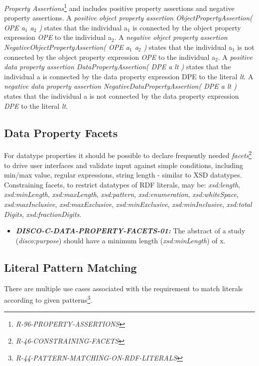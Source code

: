 \documentclass{llncs}
\begin{document}
\emph{{Property Assertions}}\footnote{\emph{R-96-PROPERTY-ASSERTIONS}}
and includes positive property assertions and negative property assertions.
A \emph{positive object property assertion ObjectPropertyAssertion( OPE a$_1$ a$_2$ )} states that the individual a$_1$ is connected by the object property expression \emph{OPE} to the individual a$_2$. 
A \emph{negative object property assertion NegativeObjectPropertyAssertion( OPE a$_1$ a$_2$ )} states that the individual a$_1$ is not connected by the object property expression \emph{OPE} to the individual a$_2$. 
A \emph{positive data property assertion DataPropertyAssertion( DPE a lt )} states that the individual a is connected by the data property expression DPE to the literal \emph{lt}. 
A \emph{negative data property assertion NegativeDataPropertyAssertion( DPE a lt )} states that the individual a is not connected by the data property expression \emph{DPE} to the literal \emph{lt}.

\subsection{Data Property Facets}

For datatype properties it should be possible to declare frequently needed \emph{facets}\footnote{\emph{R-46-CONSTRAINING-FACETS}} to drive user interfaces and validate input against simple conditions, including min/max value, regular expressions, string length - similar to XSD datatypes. 
Constraining facets, to restrict datatypes of RDF literals, may be: \emph{xsd:length}, \emph{xsd:minLength}, \emph{xsd:maxLength}, \emph{xsd:pattern}, \emph{xsd:enumeration}, \emph{xsd:whiteSpace}, \\ \emph{xsd:maxInclusive}, \emph{xsd:maxExclusive}, \emph{xsd:minExclusive}, \emph{xsd:minInclusive}, \emph{xsd:total} \emph{Digits}, \emph{xsd:fractionDigits}.

\begin{itemize}
	\item \textbf{{\em DISCO-C-DATA-PROPERTY-FACETS-01:}} The abstract of a study (\emph{disco:purpose}) should have a minimum length (\emph{xsd:minLength}) of x. 
\end{itemize}

\subsection{Literal Pattern Matching}

There are multiple use cases associated with the requirement to match literals according to given patterns\footnote{\emph{R-44-PATTERN-MATCHING-ON-RDF-LITERALS}}.
\end{document}
